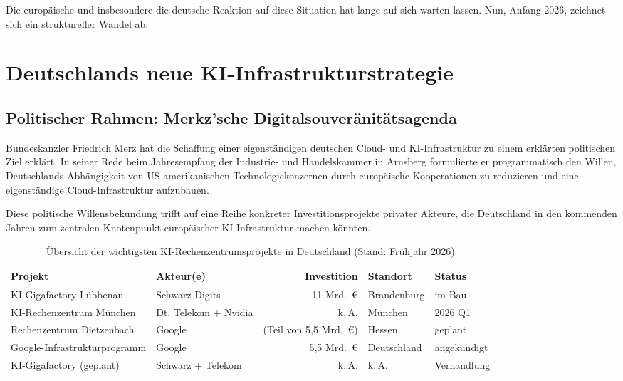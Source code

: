 \documentclass[12pt, a4paper, openany]{report}
\begin{document}
Die europäische und insbesondere die deutsche Reaktion auf diese Situation
hat lange auf sich warten lassen. Nun, Anfang 2026, zeichnet sich ein
struktureller Wandel ab.

\section{Deutschlands neue KI-Infrastrukturstrategie}
\label{sec:deutschland_strategie}

\subsection{Politischer Rahmen: Merkz'sche Digitalsouveränitätsagenda}

Bundeskanzler Friedrich Merz hat die Schaffung einer eigenständigen deutschen
Cloud- und KI-Infrastruktur zu einem erklärten politischen Ziel erklärt.
In seiner Rede beim Jahresempfang der Industrie- und Handelskammer in Arnsberg
formulierte er programmatisch den Willen, Deutschlands Abhängigkeit von US-amerikanischen
Technologiekonzernen durch europäische Kooperationen zu reduzieren
und eine eigenständige Cloud-Infrastruktur aufzubauen.

Diese politische Willensbekundung trifft auf eine Reihe konkreter
Investitionsprojekte privater Akteure, die Deutschland in den kommenden Jahren
zum zentralen Knotenpunkt europäischer KI-Infrastruktur machen könnten.

\begin{table}
	\centering
	\caption{Übersicht der wichtigsten KI-Rechenzentrumsprojekte in Deutschland (Stand: Frühjahr 2026)}
	\label{tab:rechenzentren_projekte}
	\begin{tabularx}{\textwidth}{l l r l l}
		\toprule
		\textbf{Projekt} & \textbf{Akteur(e)} & \textbf{Investition} & \textbf{Standort} & \textbf{Status} \\
		\midrule
		KI-Gigafactory Lübbenau & Schwarz Digits & 11 Mrd.\ € & Brandenburg & im Bau \\
		KI-Rechenzentrum München & Dt. Telekom + Nvidia & k.\,A. & München & 2026 Q1 \\
		Rechenzentrum Dietzenbach & Google & (Teil von 5,5 Mrd.\ €) & Hessen & geplant \\
		Google-Infrastrukturprogramm & Google & 5,5 Mrd.\ € & Deutschland & angekündigt \\
		KI-Gigafactory (geplant) & Schwarz + Telekom & k.\,A. & k.\,A. & Verhandlung \\
		\bottomrule
	\end{tabularx}
\end{table}
\end{document}
